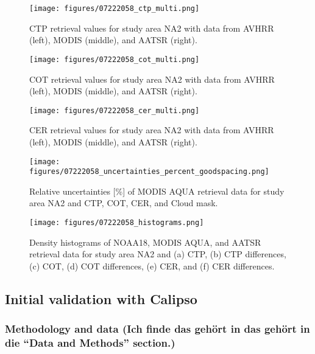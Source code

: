 \begin{figure*}[h]
  \texttt{[image: figures/07222058\_ctp\_multi.png]}
  \caption{CTP retrieval values for study area NA2 with data from AVHRR (left), MODIS (middle), and AATSR (right).}
  \label{fig:CTP_intercomparison}

  \texttt{[image: figures/07222058\_cot\_multi.png]}
  \caption{COT retrieval values for study area NA2 with data from AVHRR (left), MODIS (middle), and AATSR (right).}
  \label{fig:COT_intercomparison}

  \texttt{[image: figures/07222058\_cer\_multi.png]}
  \caption{CER retrieval values for study area NA2 with data from AVHRR (left), MODIS (middle), and AATSR (right).}
  \label{fig:CER_intercomparison}
\end{figure*}

\begin{figure*}[h]
  \texttt{[image: figures/07222058\_uncertainties\_percent\_goodspacing.png]}
  \caption{Relative uncertainties [\%] of MODIS AQUA retrieval data for study area NA2 and CTP, COT, CER, and Cloud mask.}
  \label{fig:uncertainties}
\end{figure*}

\begin{figure*}[h]
  \texttt{[image: figures/07222058\_histograms.png]}
  \caption{Density histograms of NOAA18, MODIS AQUA, and AATSR retrieval data for study area NA2 and (a) CTP, (b) CTP differences, (c) COT, (d) COT differences, (e) CER, and (f) CER differences.}
  \label{fig:histograms}
\end{figure*}

\subsection{Initial validation with Calipso}

\subsubsection{Methodology and data (Ich finde das gehört in das gehört in die ``Data and Methods'' section.)}\label{sec:calipso_method}

